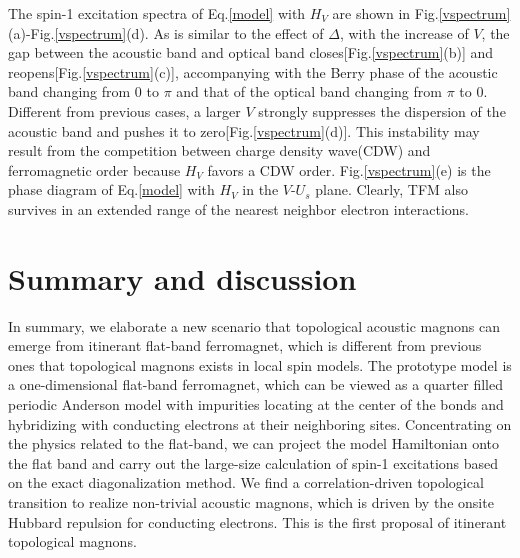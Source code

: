 \documentclass[amsmath,superscriptaddress,showpacs,aps,prb,twocolumn]{revtex4-1}
\begin{document}
\par The spin-1 excitation spectra of Eq.\ref{model} with $H_V$ are shown in Fig.\ref{vspectrum}(a)-Fig.\ref{vspectrum}(d). As is similar to the effect of $\Delta$, with the increase of $V$, the gap between the acoustic band and optical band closes[Fig.\ref{vspectrum}(b)] and reopens[Fig.\ref{vspectrum}(c)], accompanying with the Berry phase of the acoustic band changing from $0$ to $\pi$ and that of the optical band changing from $\pi$ to $0$. Different from previous cases, a larger $V$ strongly suppresses the dispersion of the acoustic band and pushes it to zero[Fig.\ref{vspectrum}(d)]. This instability may result from the competition between charge density wave(CDW) and ferromagnetic order because $H_V$ favors a CDW order. Fig.\ref{vspectrum}(e) is the phase diagram of Eq.\ref{model} with $H_V$ in the $V$-$U_s$ plane. Clearly, TFM also survives in an extended range of the nearest neighbor electron interactions.

\section{Summary and discussion}\label{sd}
\par In summary, we elaborate a new scenario that topological acoustic magnons can emerge from itinerant flat-band ferromagnet, which is different from previous ones that topological magnons exists in local spin models. The prototype model is a one-dimensional flat-band ferromagnet, which can be viewed as a quarter filled periodic Anderson model with impurities locating at the center of the bonds and hybridizing with conducting electrons at their neighboring sites. Concentrating on the physics related to the flat-band, we can project the model Hamiltonian onto the flat band and carry out the large-size calculation of spin-1 excitations based on the exact diagonalization method. We find a correlation-driven topological transition to realize non-trivial acoustic magnons, which is driven by the onsite Hubbard repulsion for conducting electrons. This is the first proposal of itinerant topological magnons.
\end{document}
